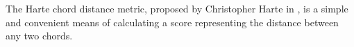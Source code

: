 The Harte chord distance metric, proposed by Christopher Harte in \cite{harte2010towards}, is a simple and convenient means of calculating a score representing the distance between any two chords.